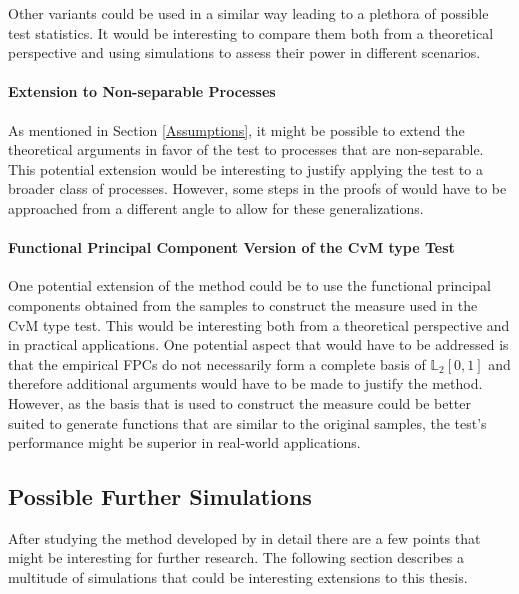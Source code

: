 \documentclass[12pt, a4paper]{article}
\theoremstyle{MAstyle} \newtheorem{assumption}{Assumption}[section]
\theoremstyle{MAstyle} \newtheorem{definition}{Definition}[section]
\theoremstyle{MAstyle} \newtheorem{theorem}{Theorem}[section]
\begin{document}
			Other variants could be used in a similar way leading to a plethora of possible test statistics. It would be interesting to compare them both from a theoretical perspective and using simulations to assess their power in different scenarios.
			
			\paragraph{Extension to Non-separable Processes\\}
			As mentioned in Section \ref{Assumptions}, it might be possible to extend the theoretical arguments in favor of the test to processes that are non-separable. This potential extension would be interesting to justify applying the test to a broader class of processes. However, some steps in the proofs of \cite{bugni_permutation_2021} would have to be approached from a different angle to allow for these generalizations.
			
			\paragraph{Functional Principal Component Version of the CvM type Test\\}
			One potential extension of the method could be to use the functional principal components obtained from the samples to construct the measure used in the CvM type test. This would be interesting both from a theoretical perspective and in practical applications. One potential aspect that would have to be addressed is that the empirical FPCs do not necessarily form a complete basis of $\mathbb{L}_2[0,1]$ and therefore additional arguments would have to be made to justify the method. However, as the basis that is used to construct the measure could be better suited to generate functions that are similar to the original samples, the test's performance might be superior in real-world applications.
		
		\subsection{Possible Further Simulations}
			After studying the method developed by \cite{bugni_permutation_2021} in detail there are a few points that might be interesting for further research. The following section describes a multitude of simulations that could be interesting extensions to this thesis.
			
\end{document}
